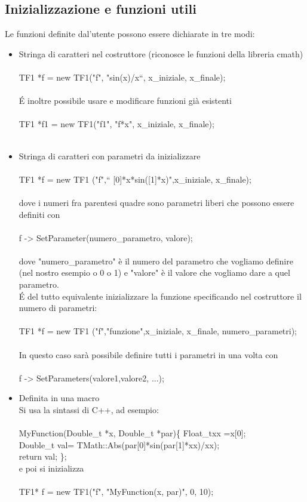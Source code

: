 \documentclass[10pt,a4paper]{article}
\begin{document}
\subsection{Inizializzazione e funzioni utili}
Le funzioni definite dal'utente possono essere dichiarate in tre modi:
\begin{itemize}
	\item Stringa di caratteri nel costruttore (riconosce le funzioni della libreria cmath)\\\\
	TF1 *f = new TF1("f", "sin(x)/x“, x\_iniziale, x\_finale);\\\\
	\'{E} inoltre possibile usare e modificare funzioni già esistenti\\\\
	TF1 *f1 = new TF1("f1", "f*x", x\_iniziale, x\_finale);\\\\
	\item Stringa di caratteri con parametri da inizializzare\\\\
	TF1 *f = new TF1 ("f",“ [0]*x*sin([1]*x)",x\_iniziale, x\_finale);\\\\
	dove i numeri fra parentesi quadre sono parametri liberi che possono essere definiti con\\\\
	f -> SetParameter(numero\_parametro, valore);\\\\
	dove "numero\_parametro" è il numero del parametro che vogliamo definire (nel nostro esempio o 0 o 1) e "valore" è il valore che vogliamo dare a quel parametro.\\
	\'{E} del tutto equivalente inizializzare la funzione specificando nel costruttore il numero di parametri:\\\\
	TF1 *f = new TF1 ("f","funzione",x\_iniziale, x\_finale, numero\_parametri);\\\\
	In questo caso sarà possibile definire tutti i parametri in una volta con\\\\
	f -> SetParameters(valore1,valore2, ...);\\
	\item Definita in una macro\\
	Si usa la sintassi di C++, ad esempio:\\\\
	MyFunction(Double\_t *x, Double\_t *par)\{
		 Float\_txx =x[0];\\
		 Double\_t val= TMath::Abs(par[0]*sin(par[1]*xx)/xx);\\
		 return val;
		 \};\\
	e poi si inizializza\\\\
	TF1* f = new TF1("f", "MyFunction(x, par)", 0, 10);
\end{itemize}
\end{document}
